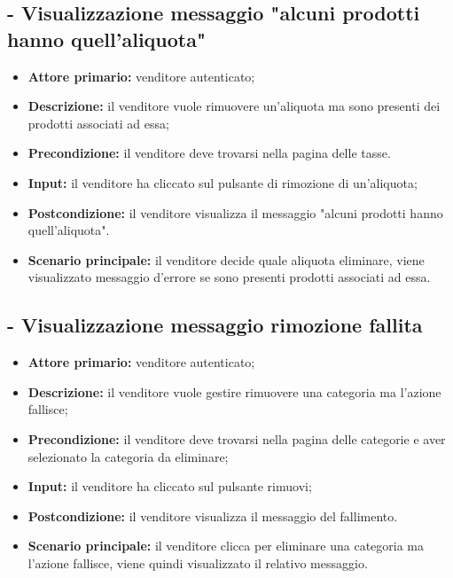 \stepUserCase
\subsection{ - Visualizzazione messaggio "alcuni prodotti hanno quell'aliquota" }
\begin{itemize}
    \item \textbf{Attore primario:} venditore autenticato;
    \item \textbf{Descrizione:} il venditore vuole rimuovere un'aliquota ma sono presenti dei prodotti associati ad essa;
    \item \textbf{Precondizione:} il venditore deve trovarsi nella pagina delle tasse.
    \item \textbf{Input:} il venditore ha cliccato sul pulsante di rimozione di un'aliquota;
    \item \textbf{Postcondizione:} il venditore visualizza il messaggio "alcuni prodotti hanno quell'aliquota".
    \item \textbf{Scenario principale:} il venditore decide quale aliquota eliminare, viene visualizzato messaggio d'errore se sono presenti prodotti associati ad essa.
\end{itemize}

\stepUserCase
\subsection{ - Visualizzazione messaggio rimozione fallita}
\begin{itemize}
    \item \textbf{Attore primario:} venditore autenticato;
    \item \textbf{Descrizione:} il venditore vuole gestire rimuovere una categoria ma l'azione fallisce;
    \item \textbf{Precondizione:} il venditore deve trovarsi nella pagina delle categorie e aver selezionato la categoria da eliminare;
    \item \textbf{Input:} il venditore ha cliccato sul pulsante rimuovi;
    \item \textbf{Postcondizione:} il venditore visualizza il messaggio del fallimento.
    \item \textbf{Scenario principale:} il venditore clicca per eliminare una categoria ma l'azione fallisce, viene quindi visualizzato il relativo messaggio.
\end{itemize}

